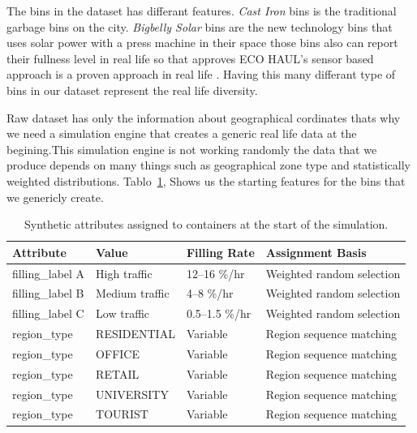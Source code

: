 \documentclass[12pt,a4paper]{report}
\begin{document}
\indent The bins in the dataset has differant features. \textit{Cast Iron} bins is the traditional garbage bins on the city. \textit{Bigbelly Solar} bins are the new technology bins that uses solar power with a press machine in their space those bins also can report their fullness level in real life so that approves ECO HAUL's sensor based approach is a proven approach in real life . Having this many differant type of bins in our dataset represent the real life  diversity.


\indent Raw dataset has only the information about geographical cordinates thats why we need a simulation engine that creates a generic real life data at the begining.This simulation engine is not working randomly the data that we produce depends on many things such as geographical zone type and statistically weighted distributions. Tablo~\ref{tab:bin_attrs}, Shows us the starting features for the bins that we genericly create.

\begin{table}[H]
\centering
\caption{Synthetic attributes assigned to containers at the start of the simulation.}
\label{tab:bin_attrs}
\begin{tabular}{llll}
\toprule
\textbf{Attribute} & \textbf{Value} & \textbf{Filling Rate} & \textbf{Assignment Basis} \\
\midrule
filling\_label A & High traffic   & 12--16 \%/hr   & Weighted random selection \\
filling\_label B & Medium traffic & 4--8 \%/hr     & Weighted random selection \\
filling\_label C & Low traffic    & 0.5--1.5 \%/hr & Weighted random selection \\
region\_type     & RESIDENTIAL    & Variable       & Region sequence matching \\
region\_type     & OFFICE         & Variable       & Region sequence matching \\
region\_type     & RETAIL         & Variable       & Region sequence matching \\
region\_type     & UNIVERSITY     & Variable       & Region sequence matching \\
region\_type     & TOURIST        & Variable       & Region sequence matching \\
\bottomrule
\end{tabular}
\end{table}
\end{document}

